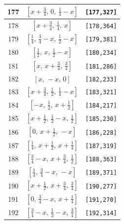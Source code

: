 \documentclass[fleqn,8pt]{jsarticle}
\begin{document}
\begin{longtable}{ccc}
177 & $\left[ x + \frac{3}{4},\, 0,\, \frac{1}{4} - x \right]$ & {\tt [177,327]} \\ \hline
178 & $\left[ x + \frac{3}{4},\, \frac{1}{4},\, x \right]$ & {\tt [178,364]} \\ \hline
179 & $\left[ \frac{1}{4},\, \frac{3}{4} - x,\, \frac{1}{2} - x \right]$ & {\tt [179,381]} \\ \hline
180 & $\left[ \frac{1}{2},\, x,\, \frac{1}{2} - x \right]$ & {\tt [180,234]} \\ \hline
181 & $\left[ x,\, x + \frac{3}{4},\, \frac{3}{4} \right]$ & {\tt [181,286]} \\ \hline
182 & $\left[ x,\, - x,\, 0 \right]$ & {\tt [182,233]} \\ \hline
183 & $\left[ x + \frac{3}{4},\, \frac{1}{2},\, \frac{1}{4} - x \right]$ & {\tt [183,321]} \\ \hline
184 & $\left[ - x,\, \frac{1}{2},\, x + \frac{1}{2} \right]$ & {\tt [184,217]} \\ \hline
185 & $\left[ x + \frac{1}{2},\, \frac{1}{2} - x,\, \frac{1}{2} \right]$ & {\tt [185,230]} \\ \hline
186 & $\left[ 0,\, x + \frac{1}{2},\, - x \right]$ & {\tt [186,228]} \\ \hline
187 & $\left[ \frac{1}{4},\, x + \frac{1}{2},\, x + \frac{1}{4} \right]$ & {\tt [187,319]} \\ \hline
188 & $\left[ \frac{3}{4} - x,\, x + \frac{3}{4},\, \frac{1}{2} \right]$ & {\tt [188,363]} \\ \hline
189 & $\left[ \frac{1}{4},\, \frac{3}{4} - x,\, - x \right]$ & {\tt [189,371]} \\ \hline
190 & $\left[ x + \frac{1}{2},\, x + \frac{3}{4},\, \frac{3}{4} \right]$ & {\tt [190,277]} \\ \hline
191 & $\left[ 0,\, \frac{3}{4} - x,\, x + \frac{1}{4} \right]$ & {\tt [191,270]} \\ \hline
192 & $\left[ \frac{3}{4} - x,\, \frac{1}{2} - x,\, \frac{3}{4} \right]$ & {\tt [192,314]} \\
\end{longtable}
\renewcommand{\arraystretch}{1.2}
\end{document}
